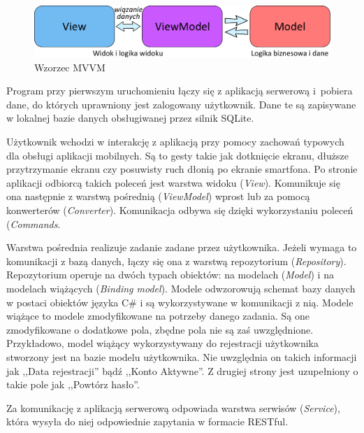 \documentclass[a4paper]{book}
\begin{document}
			\begin{figure}
				\centering
				\includegraphics[width=1.0\textwidth]{images/mvvm.pdf}
				\caption{Wzorzec MVVM }
				\label{fig:mvvmpattern}
			\end{figure} 
			
			Program przy pierwszym uruchomieniu łączy się z aplikacją serwerową i~pobiera dane, do których uprawniony jest zalogowany użytkownik. Dane te są zapisywane w lokalnej bazie danych obsługiwanej przez silnik SQLite. 
			
			Użytkownik wchodzi w interakcję z aplikacją przy pomocy zachowań typowych dla obsługi aplikacji mobilnych. Są to gesty takie jak dotknięcie ekranu, dłuższe przytrzymanie ekranu czy posuwisty ruch dłonią po ekranie smartfona. 
			Po stronie aplikacji odbiorcą takich poleceń jest warstwa widoku (\emph{View}). Komunikuje się ona następnie z warstwą pośrednią (\emph{ViewModel}) wprost lub za pomocą konwerterów (\emph{Converter}). Komunikacja odbywa się dzięki wykorzystaniu poleceń (\emph{Commands}. 
			
			Warstwa pośrednia realizuje zadanie zadane przez użytkownika. Jeżeli wymaga to komunikacji z bazą danych, łączy się ona z warstwą repozytorium (\emph{Repository}). Repozytorium operuje na dwóch typach obiektów: na modelach (\emph{Model}) i na modelach wiążących (\emph{Binding model}). Modele odwzorowują schemat bazy danych w postaci obiektów języka C\# i są wykorzystywane w komunikacji z nią. Modele wiążące to modele zmodyfikowane na potrzeby danego zadania.  %
			Są one zmodyfikowane o dodatkowe pola, zbędne pola nie są zaś uwzględnione. Przykładowo, model wiążący wykorzystywany do rejestracji użytkownika stworzony jest na bazie modelu użytkownika. Nie uwzględnia on takich informacji jak ,,Data rejestracji'' bądź ,,Konto Aktywne''. Z drugiej strony jest uzupełniony o takie pole jak ,,Powtórz hasło''.
			
			Za komunikację z aplikacją serwerową odpowiada warstwa serwisów (\emph{Service}), która wysyła do niej odpowiednie zapytania w formacie RESTful. 
			
\end{document}

